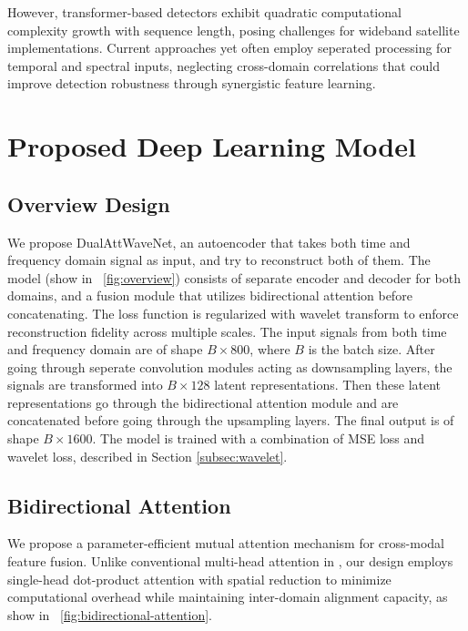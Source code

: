 \documentclass[conference]{IEEEtran}
\begin{document}
However, transformer-based detectors exhibit quadratic computational complexity growth with sequence length, posing challenges for wideband satellite implementations. Current approaches yet often employ seperated processing for temporal and spectral inputs, neglecting cross-domain correlations that could improve detection robustness through synergistic feature learning.

\section{Proposed Deep Learning Model}
\label{sec:model}

\subsection{Overview Design}

We propose DualAttWaveNet, an autoencoder that takes both time and frequency domain signal as input, and try to reconstruct both of them. The model (show in \figurename~\ref{fig:overview}) consists of separate encoder and decoder for both domains, and a fusion module that utilizes bidirectional attention before concatenating. The loss function is regularized with wavelet transform to enforce reconstruction fidelity across multiple scales. The input signals from both time and frequency domain are of shape $B \times 800$, where $B$ is the batch size. After going through seperate convolution modules acting as downsampling layers, the signals are transformed into $B \times 128$ latent representations. Then these latent representations go through the bidirectional attention module and are concatenated before going through the upsampling layers. The final output is of shape $B \times 1600$. The model is trained with a combination of MSE loss and wavelet loss, described in Section \ref{subsec:wavelet}.



\subsection{Bidirectional Attention}
\label{subsec:bi_attn}

We propose a parameter-efficient mutual attention mechanism for cross-modal feature fusion. Unlike conventional multi-head attention in \cite{vaswaniAttentionAllYou2017}, our design employs single-head dot-product attention with spatial reduction to minimize computational overhead while maintaining inter-domain alignment capacity, as show in  \figurename~\ref{fig:bidirectional-attention}.
\end{document}
